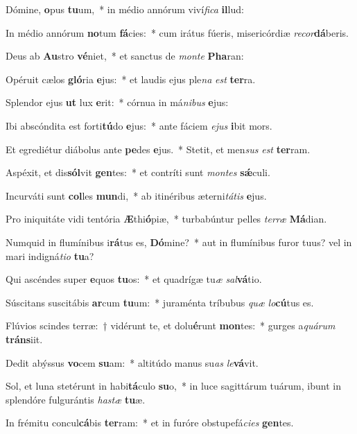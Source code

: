 \item Dómine, \textbf{o}pus \textbf{tu}um,~* in médio annórum viví\textit{fica} \textbf{il}lud:
\item In médio annórum \textbf{no}tum \textbf{fá}cies:~* cum irátus fúeris, misericórdiæ \textit{recor}\textbf{dá}beris.
\item Deus ab \textbf{Au}stro \textbf{vé}niet,~* et san\-ctus de \textit{monte} \textbf{Pha}ran:
\item Opéruit cælos \textbf{gló}ria \textbf{e}jus:~* et laudis ejus ple\textit{na} \textit{est} \textbf{ter}ra.
\item Splendor ejus \textbf{ut} lux \textbf{e}rit:~* córnua in má\tinyhspace\textit{nibus} \textbf{e}jus:
\item Ibi abscóndita est forti\textbf{tú}do \textbf{e}jus:~* ante fáciem \textit{ejus} \textbf{i}bit mors.
\item Et egrediétur diábolus ante \textbf{pe}des \textbf{e}jus.~* Stetit, et men\spurhspace\textit{sus} \textit{est} \textbf{ter}ram.
\item Aspéxit, et dis\textbf{sól}vit \textbf{gen}tes:~* et contríti sunt \textit{montes} \textbf{sǽ}culi.
\item Incurváti sunt \textbf{col}les \textbf{mun}di,~* ab itinéribus æterni\tinyhspace\textit{tátis} \textbf{e}jus.
\item Pro iniquitáte vidi tentória \textbf{Æ}thi\textbf{ó}piæ,~* turbabúntur pelles \textit{terræ} \textbf{Má}dian.
\item Numquid in flumínibus i\textbf{rá}tus es, \textbf{Dó}mine?~* aut in flumínibus furor tuus? vel in mari indigná\tinyhspace\textit{tio} \textbf{tu}a?
\item Qui ascéndes super \textbf{e}quos \textbf{tu}os:~* et quadrígæ tu\spurhspace\textit{æ} \textit{sal}\textbf{vá}tio.
\item Súscitans suscitábis \textbf{ar}cum \textbf{tu}um:~* juraménta tríbubus \textit{quæ} \textit{lo}\textbf{cú}tus es.
\item Flúvios scindes terræ:~† vidérunt te, et dolu\textbf{é}runt \textbf{mon}tes:~* gurges a\spurhspace\textit{quárum} \textbf{tráns}iit.
\item Dedit abýssus \textbf{vo}cem \textbf{su}am:~* altitúdo manus su\spurhspace\textit{as} \textit{le}\textbf{vá}vit.
\item Sol, et luna stetérunt in habi\textbf{tá}culo \textbf{su}o,~* in luce sagittárum tuárum, ibunt in splendóre fulgurántis \textit{hastæ} \textbf{tu}æ.
\item In frémitu concul\textbf{cá}bis \textbf{ter}ram:~* et in furóre obstupefá\spurhspace\textit{cies} \textbf{gen}tes.
